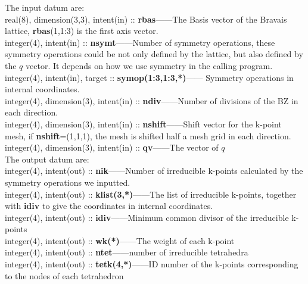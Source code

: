 \documentclass[10pt]{article}
\begin{document}
The input datum are:\\

real(8), dimension(3,3), intent(in) :: \textbf{rbas}------The Basis vector of the Bravais lattice, \textbf{rbas}(1,1:3) is the first axis vector.\\

integer(4), intent(in) :: \textbf{nsymt}------Number of symmetry operations, these symmetry operations could be not only defined by the lattice, but also defined by the $q$ vector. It depends on how we use symmetry in the calling program. \\

integer(4), intent(in), target :: \textbf{symop(1:3,1:3,*)}------ Symmetry operations in internal coordinates.\\

integer(4), dimension(3), intent(in) :: \textbf{ndiv}------Number of divisions of the BZ in each direction. \\
      
integer(4), dimension(3), intent(in) :: \textbf{nshift}------Shift vector for the k-point mesh, if \textbf{nshift}=(1,1,1), the mesh is shifted half a mesh grid in each direction. \\

integer(4), dimension(3), intent(in) :: \textbf{qv}------The vector of $q$\\


The output datum are:\\

integer(4), intent(out) :: \textbf{nik}------Number of irreducible k-points calculated by the symmetry operations we inputted.\\

integer(4), intent(out) :: \textbf{klist(3,*)}------The list of irreducible k-points, together with \textbf{idiv} to give the coordinates in internal coordinates.\\

integer(4), intent(out) :: \textbf{idiv}------Minimum common divisor of the irreducible k-points\\

integer(4), intent(out) :: \textbf{wk(*)}------The weight of each k-point\\
 
integer(4), intent(out) :: \textbf{ntet}------number of irreducible tetrahedra\\

integer(4), intent(out) :: \textbf{tetk(4,*)}------ID number of the k-points corresponding to the nodes of each tetrahedron\\
\end{document}
